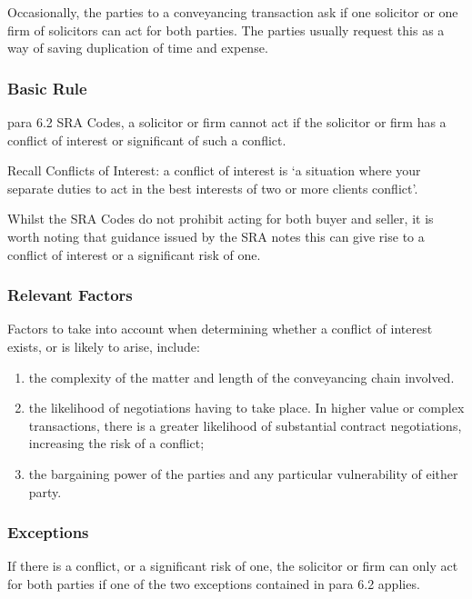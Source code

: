 \documentclass[
]{article}
\providecommand{\tightlist}{%
  \setlength{\itemsep}{0pt}\setlength{\parskip}{0pt}}
\begin{document}
Occasionally, the parties to a conveyancing transaction ask if one
solicitor or one firm of solicitors can act for both parties. The
parties usually request this as a way of saving duplication of time and
expense.

\hypertarget{basic-rule-1}{%
\subsubsection{Basic Rule}\label{basic-rule-1}}

para 6.2 SRA Codes, a solicitor or firm cannot act if the solicitor or
firm has a conflict of interest or significant of such a conflict.

Recall Conflicts of Interest: a conflict of interest is `a situation
where your separate duties to act in the best interests of two or more
clients conflict'.

Whilst the SRA Codes do not prohibit acting for both buyer and seller,
it is worth noting that guidance issued by the SRA notes this can give
rise to a conflict of interest or a significant risk of one.

\hypertarget{relevant-factors}{%
\subsubsection{Relevant Factors}\label{relevant-factors}}

Factors to take into account when determining whether a conflict of
interest exists, or is likely to arise, include:

\begin{enumerate}
\tightlist
\item
  the complexity of the matter and length of the conveyancing chain
  involved.
\item
  the likelihood of negotiations having to take place. In higher value
  or complex transactions, there is a greater likelihood of substantial
  contract negotiations, increasing the risk of a conflict;
\item
  the bargaining power of the parties and any particular vulnerability
  of either party.
\end{enumerate}

\hypertarget{exceptions}{%
\subsubsection{Exceptions}\label{exceptions}}

If there is a conflict, or a significant risk of one, the solicitor or
firm can only act for both parties if one of the two exceptions
contained in para 6.2 applies.
\end{document}
